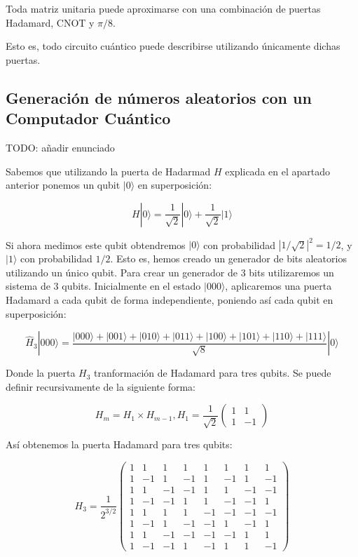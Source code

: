 \documentclass[11pt]{article}
\newcommand{\ra}{\rangle}
\newcommand{\ra}{\rangle}
\begin{document}
\begin{theorem}
	Toda matriz unitaria puede aproximarse con una combinación de puertas Hadamard, CNOT y $\pi/8$.
\end{theorem}

Esto es, todo circuito cuántico puede describirse utilizando únicamente dichas puertas.

\subsection{Generación de números aleatorios con un Computador Cuántico}

TODO: añadir enunciado

Sabemos que utilizando la puerta de Hadarmad $H$ explicada en el apartado anterior ponemos un qubit $|0\ra$ en superposición:

\[
	H|0\ra = \frac{1}{\sqrt 2} |0\ra + \frac{1}{\sqrt 2} |1\ra
\]

Si ahora medimos este qubit obtendremos $|0\ra$ con probabilidad $|1/\sqrt 2|^2 = 1/2$, y $|1\ra$ con probabilidad $1/2$. Esto es, hemos creado un generador de bits aleatorios utilizando un único qubit. Para crear un generador de 3 bits utilizaremos un sistema de 3 qubits. Inicialmente en el estado $|000\ra$, aplicaremos una puerta Hadamard a cada qubit de forma independiente, poniendo así cada qubit en superposición:

\[
	\hat H_3|000\ra = \frac{|000\ra + |001\ra + |010\ra + |011\ra + |100\ra + |101\ra + |110\ra + |111\ra}{\sqrt 8} |0\ra
\]

Donde la puerta $H_3$ tranformación de Hadamard para tres qubits. Se puede definir recursivamente de la siguiente forma:

\[
	H_m = H_1 \times H_{m-1}, H_1 = \frac{1}{\sqrt 2}
	\begin{pmatrix}
		1 & 1 \\
		1 & -1 
	\end{pmatrix}
\]

Así obtenemos la puerta Hadamard para tres qubits:

\[
H_3 = \frac{1}{2^{3/2}}
\begin{pmatrix}
	1 & 1 & 1 & 1 & 1 & 1 & 1 & 1 \\
	1 & -1 & 1 & -1 & 1 & -1 & 1 & -1 \\
	1 & 1 & -1 & -1 & 1 & 1 & -1 & -1 \\
	1 & -1 & -1 & 1 & 1 & -1 & -1 & 1 \\
	1 & 1 & 1 & 1 & -1 & -1 & -1 & -1 \\
	1 & -1 & 1 & -1 & -1 & 1 & -1 & 1 \\
	1 & 1 & -1 & -1 & -1 & -1 & 1 & 1 \\
	1 & -1 & -1 & 1 & -1 & 1 & 1 & -1
\end{pmatrix}
\]
\end{document}
